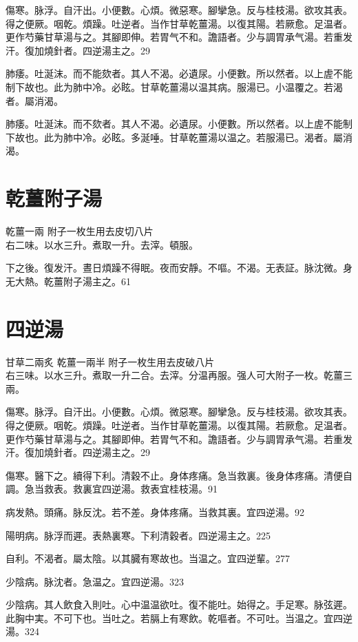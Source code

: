 傷寒。脉浮。自汗出。小便數。心煩。微惡寒。腳攣急。反与桂枝湯。欲攻其表。得之便厥。咽乾。煩躁。吐逆者。当作甘草乾薑湯。以復其陽。若厥愈。足温者。更作芍藥甘草湯与之。其腳即伸。若胃气不和。譫語者。少与{\khaaitp 調胃}承气湯。若重发汗。復加燒針者。四逆湯主之。29

肺痿。吐涎沫。而不能欬者。其人不渴。必遺尿。小便數。所以然者。以上虗不能制下故也。此为肺中冷。必眩。甘草乾薑湯以温其病。服湯已。小温覆之。若渴者。屬消渴。{\wuben}

	肺痿。吐涎沫。而不欬者。其人不渴。必遺尿。小便數。所以然者。以上虗不能制下故也。此为肺中冷。必眩。多涎唾。甘草乾薑湯以温之。若服湯已。渴者。屬消渴。{\dengben}

\section{乾薑附子湯}

乾薑{\scriptsize 一兩} 附子{\scriptsize 一枚生用去皮切八片}\\
右二味。以水三升。煮取一升。去滓。頓服。

下之後。復发汗。晝日煩躁不得眠。夜而安靜。不嘔。不渴。无表証。脉沈微。身无大熱。乾薑附子湯主之。61

\section{四逆湯}

甘草{\scriptsize 二兩炙} 乾薑{\scriptsize 一兩半} 附子{\scriptsize 一枚生用去皮破八片}\\
右三味。以水三升。煮取一升二合。去滓。分温再服。强人可大附子一枚。乾薑三兩。

傷寒。脉浮。自汗出。小便數。心煩。微惡寒。腳攣急。反与桂枝湯。欲攻其表。得之便厥。咽乾。煩躁。吐逆者。当作甘草乾薑湯。以復其陽。若厥愈。足温者。更作芍藥甘草湯与之。其腳即伸。若胃气不和。譫語者。少与{\khaaitp 調胃}承气湯。若重发汗。復加燒針者。四逆湯主之。29

傷寒。醫下之。續得下利。清穀不止。身体疼痛。急当救裏。後身体疼痛。清便自調。急当救表。救裏宜四逆湯。救表宜桂枝湯。91

病发熱。頭痛。脉反沈。若不差。身体疼痛。当救其裏。宜四逆湯。92

{\khaaitp 陽明病。}脉浮而遲。表熱裏寒。下利清穀者。四逆湯主之。225

自利。不渴者。屬太陰。以其臓有寒故也。当温之。宜四逆輩。277

少陰病。脉沈者。急温之。宜四逆湯。323

少陰病。其人飲食入則吐。心中温温欲吐。復不能吐。始得之。手足寒。脉弦遲。此胸中実。不可下也。当吐之。若膈上有寒飲。乾嘔者。不可吐。当温之。宜四逆湯。324

